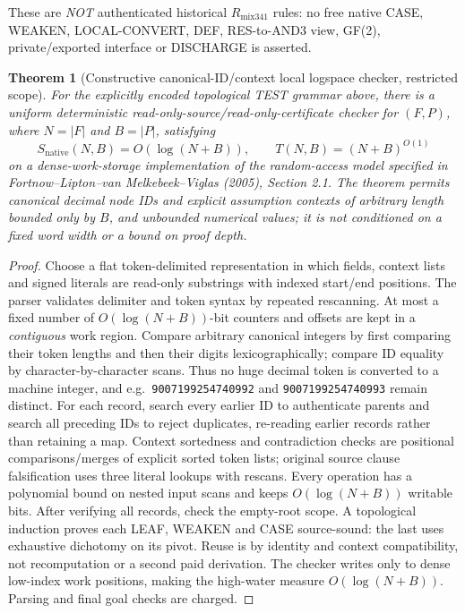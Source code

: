\documentclass[11pt]{article}
\newtheorem{theorem}{Theorem}
\begin{document}
These are \emph{NOT} authenticated historical $R_{\mathrm{mix341}}$ rules: no free native CASE, WEAKEN, LOCAL-CONVERT, DEF, RES-to-AND3 view, GF(2), private/exported interface or DISCHARGE is asserted.

\begin{theorem}[Constructive canonical-ID/context local logspace checker, restricted scope]
For the explicitly encoded topological TEST grammar above, there is a uniform deterministic read-only-source/read-only-certificate checker for $(F,P)$, where $N=|F|$ and $B=|P|$, satisfying
\[
S_{\mathrm{native}}(N,B)=O(\log(N+B)),\qquad
T(N,B)=(N+B)^{O(1)}
\]
on a dense-work-storage implementation of the random-access model specified in Fortnow--Lipton--van Melkebeek--Viglas (2005), Section 2.1. The theorem permits canonical decimal node IDs and explicit assumption contexts of arbitrary length bounded only by $B$, and unbounded numerical values; it is not conditioned on a fixed word width or a bound on proof depth.
\end{theorem}
\begin{proof}
Choose a flat token-delimited representation in which fields, context lists and signed literals are read-only substrings with indexed start/end positions. The parser validates delimiter and token syntax by repeated rescanning. At most a fixed number of $O(\log(N+B))$-bit counters and offsets are kept in a \emph{contiguous} work region. Compare arbitrary canonical integers by first comparing their token lengths and then their digits lexicographically; compare ID equality by character-by-character scans. Thus no huge decimal token is converted to a machine integer, and e.g.\ \texttt{9007199254740992} and \texttt{9007199254740993} remain distinct. For each record, search every earlier ID to authenticate parents and search all preceding IDs to reject duplicates, re-reading earlier records rather than retaining a map. Context sortedness and contradiction checks are positional comparisons/merges of explicit sorted token lists; original source clause falsification uses three literal lookups with rescans. Every operation has a polynomial bound on nested input scans and keeps $O(\log(N+B))$ writable bits. After verifying all records, check the empty-root scope. A topological induction proves each LEAF, WEAKEN and CASE source-sound: the last uses exhaustive dichotomy on its pivot. Reuse is by identity and context compatibility, not recomputation or a second paid derivation. The checker writes only to dense low-index work positions, making the high-water measure $O(\log(N+B))$. Parsing and final goal checks are charged.
\end{proof}
\end{document}

